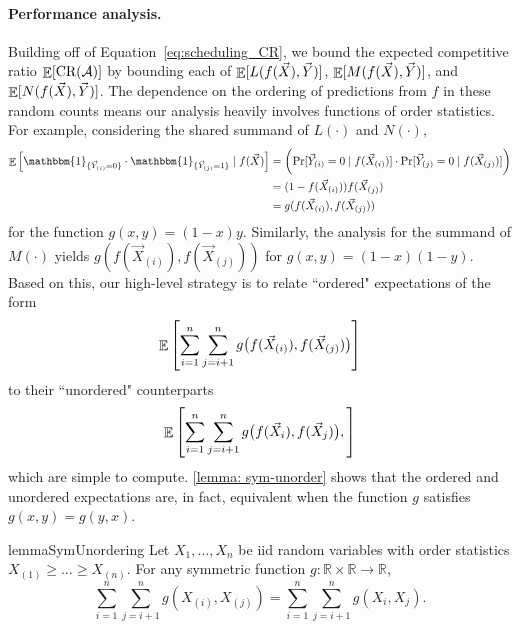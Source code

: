 \paragraph{Performance analysis.} Building off of Equation~\eqref{eq:scheduling_CR}, we bound the expected competitive ratio $\mathop{\mathbb{E}}[\textnormal{CR}(\mathcal{A})]$ by bounding each of $\mathop{\mathbb{E}}[L(f(\vec{X}), \vec{Y})]$, $\mathop{\mathbb{E}}[M(f(\vec{X}), \vec{Y})]$, and $\mathop{\mathbb{E}}[N(f(\vec{X}), \vec{Y})]$. The dependence on the ordering of predictions from $f$ in these random counts means our analysis heavily involves functions of order statistics. For example, considering the shared summand of $L(\cdot)$ and $N(\cdot)$,
\begin{align*}
    \E\left[\mathbbm{1}_{\{\vec{Y}_{(i)} = 0 \}}\cdot \mathbbm{1}_{\{\vec{Y}_{(j)} = 1 \}} \mid f(\vec{X}) \right]
    &=  \biggl(\Pr[\vec{Y}_{(i)} = 0 \mid f(\vec{X}_{(i)}) ] \cdot  \Pr[\vec{Y}_{(j)} = 0 \mid f(\vec{X}_{(j)})] \biggr)\\
    &= (1-f(\vec{X}_{(i)}))f(\vec{X}_{(j)})\\
    &= g(f(\vec{X}_{(i)}), f(\vec{X}_{(j)}))
\end{align*}
for the function $g(x,y) = (1-x)y$. Similarly, the analysis for the summand of $M(\cdot)$ yields $g(f(\vec{X}_{(i)}), f(\vec{X}_{(j)}))$ for $g(x,y) = (1-x)(1-y)$. Based on this, our high-level strategy is to relate ``ordered" expectations of the form
\[\mathop{\mathbb{E}}\left[\sum_{i=1}^n \sum_{j=i+1}^n g\bigl(f(\vec{X}_{(i)}), f(\vec{X}_{(j)})\bigr)\right] \]
to their ``unordered" counterparts
\[\mathop{\mathbb{E}}\left[\sum_{i=1}^n \sum_{j=i+1}^n g\bigl(f(\vec{X}_{i}), f(\vec{X}_{j})\bigr),\right] \]
which are simple to compute. \cref{lemma: sym-unorder} shows that the ordered and unordered expectations are, in fact, equivalent when the function $g$ satisfies $g(x,y)=g(y,x)$. 

\begin{restatable}{lemma}{SymUnordering}\label{lemma: sym-unorder}
Let $X_1, \dots, X_n$ be iid random variables with order statistics $X_{(1)} \geq \dots \geq X_{(n)}$. For any symmetric function $g:\mathbb{R} \times \mathbb{R} \to \mathbb{R}$,
\[\sum_{i=1}^n \sum_{j = i+1}^n g(X_{(i)}, X_{(j)}) = \sum_{i=1}^n \sum_{j = i+1}^n g(X_{i}, X_{j}).\]
\end{restatable}


